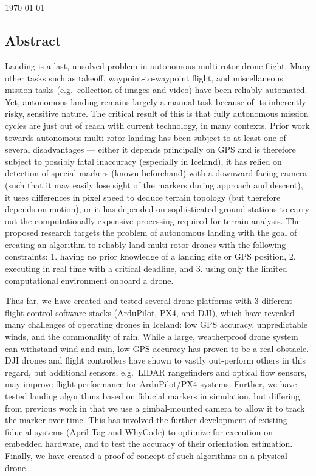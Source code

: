 \begin{center}
    \Large
    \textbf{\documenttitle}
    ~\\[0.5cm]
    \documentauthor
    ~\\[0.5cm]
    \specialdate\today
\end{center}

\subsection*{Abstract}

Landing is a last, unsolved problem in autonomous multi-rotor drone flight.
Many other tasks such as takeoff, waypoint-to-waypoint flight,
and miscellaneous mission tasks (e.g.~collection of images and video) have been reliably automated.
Yet, autonomous landing remains largely a manual task because of its inherently risky, sensitive nature.
The critical result of this is that fully autonomous mission cycles are just out of reach with current technology, in many contexts.
Prior work towards autonomous multi-rotor landing has been subject to at least one of several disadvantages ---
either it depends principally on GPS and is therefore subject to possibly fatal inaccuracy (especially in Iceland),
it has relied on detection of special markers (known beforehand) with a downward facing camera (such that it may easily lose sight of the markers during approach and descent),
it uses differences in pixel speed to deduce terrain topology (but therefore depends on motion),
or it has depended on sophisticated ground stations to carry out the computationally expensive processing required for terrain analysis.
The proposed research targets the problem of autonomous landing
with the goal of creating an algorithm to reliably land multi-rotor drones
with the following constraints:
1. having no prior knowledge of a landing site or GPS position,
2. executing in real time with a critical deadline, and
3. using only the limited computational environment onboard a drone.

Thus far, we have created and tested several drone platforms with 3 different flight control software stacks (ArduPilot, PX4, and DJI),
which have revealed many challenges of operating drones in Iceland: low GPS accuracy, unpredictable winds, and the commonality of rain.
While a large, weatherproof drone system can withstand wind and rain, low GPS accuracy has proven to be a real obstacle.
DJI drones and flight controllers have shown to vastly out-perform others in this regard,
but additional sensors, e.g.~LIDAR rangefinders and optical flow sensors, may improve flight performance for ArduPilot/PX4 systems.
Further, we have tested landing algorithms based on fiducial markers in simulation,
but differing from previous work in that we use a gimbal-mounted camera to allow it to track the marker over time.
This has involved the further development of existing fiducial systems (April Tag and WhyCode) to optimize for execution on embedded hardware,
and to test the accuracy of their orientation estimation.
Finally, we have created a proof of concept of such algorithms on a physical drone.

